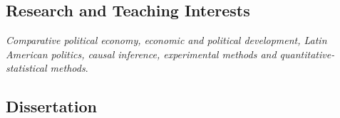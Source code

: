 \subsection*{Research and Teaching Interests}

	\emph{Comparative political economy, economic and political development, Latin American politics, causal inference, experimental methods and quantitative-statistical methods}.

\subsection*{Dissertation}

	{\unskip}
